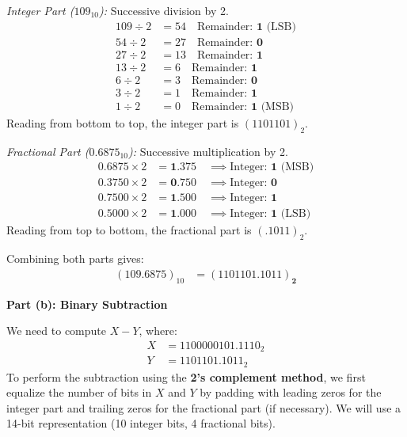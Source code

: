 \documentclass[12pt,a3paper]{article}
\begin{document}
\begin{enumerate}
\begin{tcolorbox}[enhanced,breakable,ansbox,colback=cD!4,colframe=cD,boxrule=0.8pt,arc=5pt,title={\textbf{Answer}},fonttitle=\bfseries\color{white},colbacktitle=cD]
\textit{Integer Part ($109_{10}$):} Successive division by 2.
\begin{align*}
    109 \div 2 &= 54 \quad \text{Remainder: } \mathbf{1} \text{ (LSB)} \\
    54 \div 2 &= 27 \quad \text{Remainder: } \mathbf{0} \\
    27 \div 2 &= 13 \quad \text{Remainder: } \mathbf{1} \\
    13 \div 2 &= 6 \quad \text{Remainder: } \mathbf{1} \\
    6 \div 2 &= 3 \quad \text{Remainder: } \mathbf{0} \\
    3 \div 2 &= 1 \quad \text{Remainder: } \mathbf{1} \\
    1 \div 2 &= 0 \quad \text{Remainder: } \mathbf{1} \text{ (MSB)}
\end{align*}
Reading from bottom to top, the integer part is $(1101101)_2$.

\textit{Fractional Part ($0.6875_{10}$):} Successive multiplication by 2.
\begin{align*}
    0.6875 \times 2 &= \mathbf{1}.375 \quad \implies \text{Integer: } \mathbf{1} \text{ (MSB)} \\
    0.3750 \times 2 &= \mathbf{0}.750 \quad \implies \text{Integer: } \mathbf{0} \\
    0.7500 \times 2 &= \mathbf{1}.500 \quad \implies \text{Integer: } \mathbf{1} \\
    0.5000 \times 2 &= \mathbf{1}.000 \quad \implies \text{Integer: } \mathbf{1} \text{ (LSB)}
\end{align*}
Reading from top to bottom, the fractional part is $(.1011)_2$.

Combining both parts gives:
\begin{align*}
    (109.6875)_{10} &= \mathbf{(1101101.1011)_2}
\end{align*}

\vspace{1em}
\textbf{\textcolor{cD}{Part (b): Binary Subtraction}}

We need to compute $X - Y$, where:
\begin{align*}
    X &= 1100000101.1110_2 \\
    Y &= 1101101.1011_2
\end{align*}
To perform the subtraction using the \textbf{2's complement method}, we first equalize the number of bits in $X$ and $Y$ by padding with leading zeros for the integer part and trailing zeros for the fractional part (if necessary). We will use a 14-bit representation (10 integer bits, 4 fractional bits).


\end{tcolorbox}
\end{enumerate}
\end{document}
